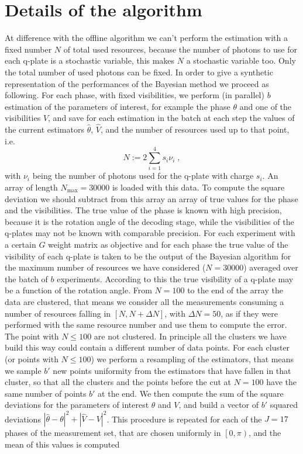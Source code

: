 \documentclass[aps, pra, 10pt, twocolumn, superscriptaddress,floatfix]{revtex4-1}
\begin{document}
\section{Details of the algorithm}
%
At difference with the offline algorithm we can't perform the estimation with a fixed number $N$ of total used resources, because the number of photons to use for each q-plate is a stochastic variable, this makes $N$ a stochastic variable too. Only the total number of used photons can be fixed. In order to give a synthetic representation of the performances of the Bayesian method we proceed as following. For each phase, with fixed visibilities, we perform (in parallel) $b$ estimation of the parameters of interest, for example the phase $\theta$ and one of the visibilities $V$, and save for each estimation in the batch at each step the values of the current estimators $\hat{\theta}$, $\hat{V}$, and the number of resources used up to that point, i.e.
%
\begin{equation}
	N := 2 \sum_{i=1}^4 s_i \nu_i \; ,
\end{equation}
%
with $\nu_i$ being the number of photons used for the q-plate with charge $s_i$. An array of length $N_{\max} = 30000$ is loaded with this data. To compute the square deviation we should subtract from this array an array of true values for the phase and the visibilities. The true value of the phase is known with high precision, because it is the rotation angle of the decoding stage, while the visibilities of the q-plates may not be known with comparable precision. For each experiment with a certain $G$ weight matrix as objective and for each phase the true value of the visibility of each q-plate is taken to be the output of the Bayesian algorithm for the maximum number of resources we have considered ($N = 30000$) averaged over the batch of $b$ experiments. According to this the true visibility of a q-plate may be a function of the rotation angle. From $N=100$ to the end of the array the data are clustered, that means we consider all the measurements consuming a number of resources falling in $[N, N+\Delta N]$, with $\Delta N = 50$, as if they were performed with the same resource number and use them to compute the error. The point with $N \le 100$ are not clustered. In principle all the clusters we have build this way could contain a different number of data points. For each cluster (or points with $N \le 100$) we perform a resampling of the estimators, that means we sample $b'$ new points uniformity from the estimators that have fallen in that cluster, so that all the clusters and the points before the cut at $N=100$ have the same number of points $b'$ at the end. We then compute the sum of the square deviations for the parameters of interest $\theta$ and $V$, and build a vector of $b'$ squared deviations $|\hat{\theta} - \theta|^2 + |\hat{V} - V|^2$. This procedure is repeated for each of the $J=17$ phases of the measurement set, that are chosen uniformly in $\left[0, \pi \right)$, and the mean of this values is computed
\end{document}
